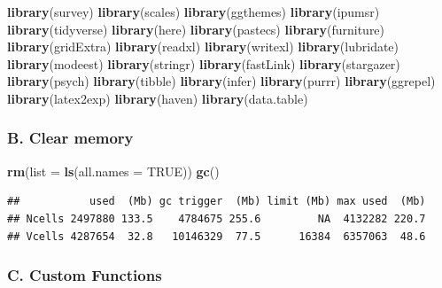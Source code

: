 \documentclass[
]{article}
\newenvironment{Shaded}{\begin{snugshade}}{\end{snugshade}}
\newcommand{\AttributeTok}[1]{\textcolor[rgb]{0.13,0.29,0.53}{#1}}
\newcommand{\ConstantTok}[1]{\textcolor[rgb]{0.56,0.35,0.01}{#1}}
\newcommand{\FunctionTok}[1]{\textcolor[rgb]{0.13,0.29,0.53}{\textbf{#1}}}
\newcommand{\NormalTok}[1]{#1}
\begin{document}
\begin{Shaded}
\begin{Highlighting}[]
\FunctionTok{library}\NormalTok{(survey)      }
\FunctionTok{library}\NormalTok{(scales)      }
\FunctionTok{library}\NormalTok{(ggthemes)    }
\FunctionTok{library}\NormalTok{(ipumsr)}
\FunctionTok{library}\NormalTok{(tidyverse)}
\FunctionTok{library}\NormalTok{(here)}
\FunctionTok{library}\NormalTok{(pastecs)}
\FunctionTok{library}\NormalTok{(furniture)}
\FunctionTok{library}\NormalTok{(gridExtra)}
\FunctionTok{library}\NormalTok{(readxl)}
\FunctionTok{library}\NormalTok{(writexl)}
\FunctionTok{library}\NormalTok{(lubridate)}
\FunctionTok{library}\NormalTok{(modeest)}
\FunctionTok{library}\NormalTok{(stringr)}
\FunctionTok{library}\NormalTok{(fastLink)}
\FunctionTok{library}\NormalTok{(stargazer)}
\FunctionTok{library}\NormalTok{(psych)}
\FunctionTok{library}\NormalTok{(tibble)}
\FunctionTok{library}\NormalTok{(infer)}
\FunctionTok{library}\NormalTok{(purrr)}
\FunctionTok{library}\NormalTok{(ggrepel)}
\FunctionTok{library}\NormalTok{(latex2exp)}
\FunctionTok{library}\NormalTok{(haven)}
\FunctionTok{library}\NormalTok{(data.table)}
\end{Highlighting}
\end{Shaded}

\subsubsection{B. Clear memory}\label{b.-clear-memory}

\begin{Shaded}
\begin{Highlighting}[]
\FunctionTok{rm}\NormalTok{(}\AttributeTok{list =} \FunctionTok{ls}\NormalTok{(}\AttributeTok{all.names =} \ConstantTok{TRUE}\NormalTok{))}
\FunctionTok{gc}\NormalTok{()}
\end{Highlighting}
\end{Shaded}

\begin{verbatim}
##           used  (Mb) gc trigger  (Mb) limit (Mb) max used  (Mb)
## Ncells 2497880 133.5    4784675 255.6         NA  4132282 220.7
## Vcells 4287654  32.8   10146329  77.5      16384  6357063  48.6
\end{verbatim}

\subsubsection{C. Custom Functions}\label{c.-custom-functions}
\end{document}
